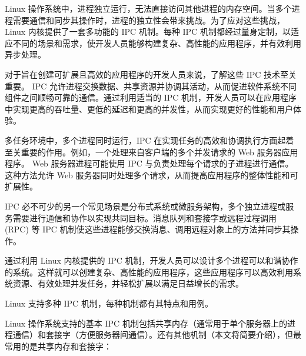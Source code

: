 
Linux 操作系统中，进程独立运行，无法直接访问其他进程的内存空间。当多个进程需要通信和同步其操作时，进程的独立性会带来挑战。为了应对这些挑战， Linux 内核提供了一套多功能的 IPC 机制。每种 IPC 机制都经过量身定制，以适应不同的场景和需求，使开发人员能够构建复杂、高性能的应用程序，并有效利用异步处理。

对于旨在创建可扩展且高效的应用程序的开发人员来说，了解这些 IPC 技术至关重要。 IPC 允许进程交换数据、共享资源并协调其活动，从而促进软件系统不同组件之间顺畅可靠的通信。通过利用适当的 IPC 机制，开发人员可以在应用程序中实现更高的吞吐量、更低的延迟和更高的并发性，从而实现更好的性能和用户体验。

多任务环境中，多个进程同时运行，IPC 在实现任务的高效和协调执行方面起着至关重要的作用。例如，一个处理来自客户端的多个并发请求的 Web 服务器应用程序。 Web 服务器进程可能使用 IPC 与负责处理每个请求的子进程进行通信。这种方法允许 Web 服务器同时处理多个请求，从而提高应用程序的整体性能和可扩展性。

IPC 必不可少的另一个常见场景是分布式系统或微服务架构，多个独立进程或服务需要进行通信和协作以实现共同目标。消息队列和套接字或远程过程调用 (RPC) 等 IPC 机制使这些进程能够交换消息、调用远程对象上的方法并同步其操作。

通过利用 Linux 内核提供的 IPC 机制，开发人员可以设计多个进程可以和谐协作的系统。这样就可以创建复杂、高性能的应用程序，这些应用程序可以高效利用系统资源、有效处理并发任务，并轻松扩展以满足日益增长的需求。


Linux 支持多种 IPC 机制，每种机制都有其特点和用例。

Linux 操作系统支持的基本 IPC 机制包括共享内存（通常用于单个服务器上的进程通信）和套接字（方便服务器间通信）。还有其他机制（本文将简要介绍），但最常用的是共享内存和套接字：


